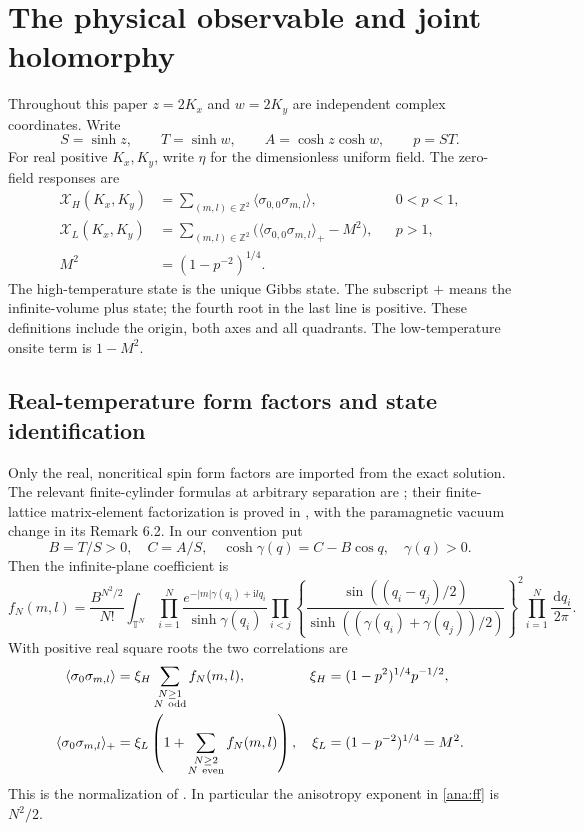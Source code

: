 \documentclass[11pt]{article}
\numberwithin{equation}{section}
\theoremstyle{definition}
\newcommand{\Z}{\mathbb Z}
\newcommand{\T}{\mathbb T}
\newcommand{\ii}{\mathrm i}
\newcommand{\dd}{\,\mathrm d}
\newcommand{\XH}{\mathcal X_H}
\newcommand{\XL}{\mathcal X_L}
\begin{document}
\section{The physical observable and joint holomorphy}
\label{ana:physical}

Throughout this paper \(z=2K_x\) and \(w=2K_y\) are independent
complex coordinates. Write
\[
 S=\sinh z,\qquad T=\sinh w,\qquad
 A=\cosh z\cosh w,\qquad p=ST.
\]
For real positive \(K_x,K_y\), write \(\eta\) for the
dimensionless uniform field. The zero-field responses are
\begin{align}
 \XH(K_x,K_y)
 &=\sum_{(m,l)\in\Z^2}\langle\sigma_{0,0}\sigma_{m,l}\rangle,
 &&0<p<1, \label{ana:physicalHT}\\
 \XL(K_x,K_y)
 &=\sum_{(m,l)\in\Z^2}
   \bigl(\langle\sigma_{0,0}\sigma_{m,l}\rangle_+-M^2\bigr),
 &&p>1, \label{ana:physicalLT}\\
 M^2&=(1-p^{-2})^{1/4}. \nonumber
\end{align}
The high-temperature state is the unique Gibbs state. The subscript
\(+\) means the infinite-volume plus state; the fourth root in the last
line is positive. These definitions include the origin, both axes and
all quadrants. The low-temperature onsite term is \(1-M^2\).

\subsection{Real-temperature form factors and state identification}
\label{ana:interface}

Only the real, noncritical spin form factors are imported from the
exact solution. The relevant finite-cylinder formulas at arbitrary
separation are \cite[(35)--(39)]{BL}; their finite-lattice matrix-element
factorization is proved in \cite[Theorem 6.1]{IL}, with the
paramagnetic vacuum change in its Remark 6.2. In our convention put
\[
 B=T/S>0,\quad C=A/S,\quad
 \cosh\gamma(q)=C-B\cos q,\quad \gamma(q)>0.
\]
Then the infinite-plane coefficient is
\begin{equation}\label{ana:ff}
 f_N(m,l)=\frac{B^{N^2/2}}{N!}
 \int_{\T^N}\prod_{i=1}^N
 \frac{e^{-|m|\gamma(q_i)+\ii lq_i}}{\sinh\gamma(q_i)}
 \prod_{i<j}
 \left\{\frac{\sin((q_i-q_j)/2)}
 {\sinh((\gamma(q_i)+\gamma(q_j))/2)}\right\}^{\!2}
 \prod_{i=1}^N\frac{\dd q_i}{2\pi}.
\end{equation}
With positive real square roots the two correlations are
\begin{align}
 \langle\sigma_0\sigma_{m,l}\rangle
 &=\xi_H\sum_{\substack{N\ge1\\N\ {\rm odd}}}f_N(m,l),
 &\xi_H&=(1-p^2)^{1/4}p^{-1/2},\label{ana:corHT}\\
 \langle\sigma_0\sigma_{m,l}\rangle_+
 &=\xi_L\left(1+\sum_{\substack{N\ge2\\N\ {\rm even}}}f_N(m,l)\right),
 &\xi_L&=(1-p^{-2})^{1/4}=M^2.\label{ana:corLT}
\end{align}
This is the normalization of \cite[(1.8)--(1.10)]{ONGP}.
In particular the anisotropy exponent in \eqref{ana:ff} is \(N^2/2\).
\end{document}
